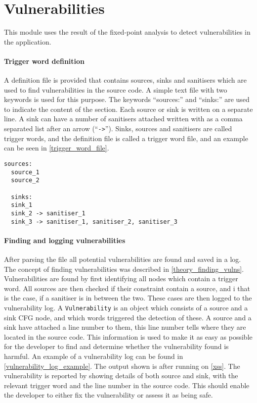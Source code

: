 \section{Vulnerabilities}
This module uses the result of the fixed-point analysis to detect vulnerabilities in the application.

\paragraph{Trigger word definition}
A definition file is provided that contains sources, sinks and sanitisers which are used to find vulnerabilities in the source code.
A simple text file with two keywords  is used for this purpose.
The keywords ``sources:'' and ``sinks:'' are used to indicate the content of the section.
Each source or sink is written on a separate line.
A sink can have a number of sanitisers attached written with as a comma separated list after an arrow (``\texttt{->}'').
Sinks, sources and sanitisers are called trigger words, and the definition file is called a trigger word file, and an example can be seen in \cref{trigger_word_file}.
\begin{lstlisting}[style=default, caption={How the trigger word file should be defined.}, label={trigger_word_file}]
  sources:
  source_1
  source_2

  sinks:
  sink_1
  sink_2 -> sanitiser_1
  sink_3 -> sanitiser_1, sanitiser_2, sanitiser_3
\end{lstlisting}

\paragraph{Finding and logging vulnerabilities}
After parsing the file all potential vulnerabilities are found and saved in a log.
The concept of finding vulnerabilities was described in \cref{theory_finding_vulns}.
Vulnerabilities are found by first identifying all nodes which contain a trigger word.
All sources are then checked if their constraint contain a source, and i that is the case, if a sanitiser is in between the two.
These cases are then logged to the vulnerability log.
A \texttt{Vulnerability} is an object which consists of a source and a sink CFG node, and which words triggered the detection of these.
A source and a sink have attached a line number to them, this line number tells where they are located in the source code.
This information is used to make it as easy as possible for the developer to find and determine whether the vulnerability found is harmful.
An example of a vulnerability log can be found in \cref{vulnerability_log_example}.
The output shown is after running \pyt{} on \cref{xss}.
The vulnerability is reported by showing details of both source and sink, with the relevant trigger word and the line number in the source code.
This should enable the developer to either fix the vulnerability or assess it as being safe.

